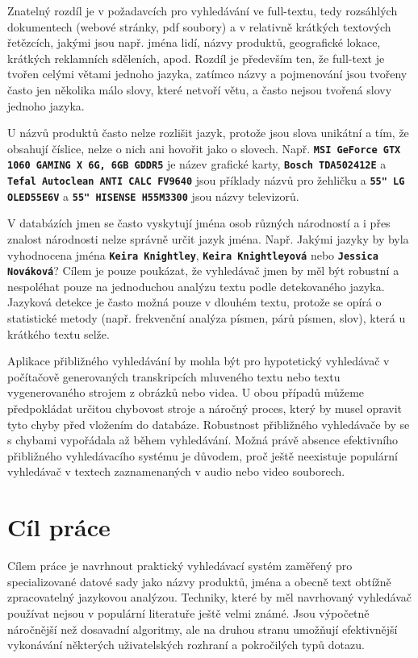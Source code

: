 \documentclass[11pt,letterpaper,oneside,openright]{book}
\newcommand{\bftt}[1]{\texttt{\textbf{#1}}}
\begin{document}
Znatelný rozdíl je v požadavcích pro vyhledávání ve full-textu, tedy rozsáhlých
dokumentech (webové stránky, pdf soubory) a v relativně krátkých textových
řetězcích, jakými jsou např. jména lidí, názvy produktů, geografické lokace,
krátkých reklamních sděleních, apod. Rozdíl je především ten, že full-text je
tvořen celými větami jednoho jazyka, zatímco názvy a pojmenování jsou tvořeny
často jen několika málo slovy, které netvoří větu, a často nejsou tvořená slovy
jednoho jazyka.

U názvů produktů často nelze rozlišit jazyk, protože jsou slova unikátní a tím,
že obsahují číslice, nelze o nich ani hovořit jako o slovech. Např. \bftt{MSI
GeForce GTX 1060 GAMING X 6G, 6GB GDDR5} je název grafické karty, \bftt{Bosch
TDA502412E} a \bftt{Tefal Autoclean ANTI CALC FV9640} jsou příklady názvů pro
žehličku a \bftt{55" LG OLED55E6V} a \bftt{55" HISENSE H55M3300} jsou názvy
televizorů.

V databázích jmen se často vyskytují jména osob různých národností a i přes
znalost národnosti nelze správně určit jazyk jména. Např. Jakými jazyky by byla
vyhodnocena jména \bftt{Keira Knightley}, \bftt{Keira Knightleyová} nebo
\bftt{Jessica Nováková}? Cílem je pouze poukázat, že vyhledávač jmen by měl být
robustní a nespoléhat pouze na jednoduchou analýzu textu podle detekovaného
jazyka. Jazyková detekce je často možná pouze v dlouhém textu, protože se opírá
o statistické metody (např. frekvenční analýza písmen, párů písmen, slov),
která u krátkého textu selže.

Aplikace přibližného vyhledávání by mohla být pro hypotetický vyhledávač v
počítačově generovaných transkripcích mluveného textu nebo textu vygenerovaného
strojem z obrázků nebo videa. U obou případů můžeme předpokládat určitou
chybovost stroje a náročný proces, který by musel opravit tyto chyby před
vložením do databáze. Robustnost přibližného vyhledávače by se s chybami
vypořádala až během vyhledávání. Možná právě absence efektivního přibližného
vyhledávacího systému je důvodem, proč ještě neexistuje populární vyhledávač v
textech zaznamenaných v audio nebo video souborech.



\section{Cíl práce}
Cílem práce je navrhnout praktický vyhledávací systém zaměřený pro
specializované datové sady jako názvy produktů, jména a obecně text obtížně
zpracovatelný jazykovou analýzou. Techniky, které by měl navrhovaný vyhledávač
používat nejsou v populární literatuře ještě velmi známé. Jsou výpočetně
náročnější než dosavadní algoritmy, ale na druhou stranu umožňují efektivnější
vykonávání některých uživatelských rozhraní a pokročilých typů dotazu.
\end{document}

